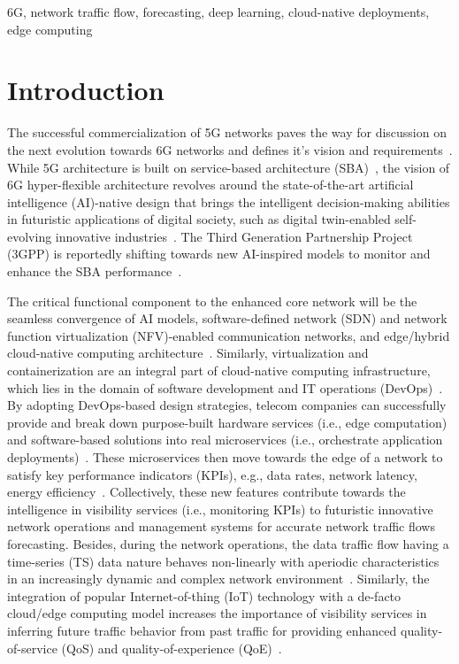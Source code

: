 \documentclass[10pt, conference]{IEEEtran}
\begin{document}
\begin{IEEEkeywords}
6G, network traffic flow, forecasting, deep learning, cloud-native deployments, edge computing
\end{IEEEkeywords}
\IEEEpeerreviewmaketitle

\section{Introduction}
The successful commercialization of 5G networks paves the way for discussion on the next evolution towards 6G networks and defines it's vision and requirements~\cite{saad2019vision}.
While 5G architecture is built on service-based architecture (SBA)~\cite{Aamir_IIoT}, the vision of 6G hyper-flexible architecture revolves around the state-of-the-art artificial intelligence (AI)-native design that brings the intelligent decision-making abilities in futuristic applications of digital society, such as digital twin-enabled self-evolving innovative industries~\cite{Roadmap,zeb2021industrial}. 
The Third Generation Partnership Project (3GPP) is reportedly shifting towards new AI-inspired models to monitor and enhance the SBA performance~\cite{ref}.

The critical functional component to the enhanced core network will be the seamless convergence of AI models, software-defined network (SDN) and network function virtualization (NFV)-enabled communication networks, and edge/hybrid cloud-native computing architecture~\cite{xiao2020toward,zeb2020}. Similarly, virtualization and containerization are an integral part of cloud-native computing infrastructure, which lies in the domain of software development and IT operations (DevOps)~\cite{waseem2020systematic}. By adopting DevOps-based design strategies, telecom companies can successfully provide and break down purpose-built hardware services (i.e., edge computation) and software-based solutions into real microservices (i.e., orchestrate application deployments)~\cite{kube5g}. These microservices then move towards the edge of a network to satisfy key performance indicators (KPIs), e.g., data rates, network latency, energy efficiency~\cite{SDNandCloudflow}. Collectively, these new features contribute towards the intelligence in visibility services (i.e., monitoring KPIs) to futuristic innovative network operations and management systems for accurate network traffic flows forecasting. Besides, during the network operations, the data traffic flow having a time-series (TS) data nature behaves non-linearly with aperiodic characteristics in an increasingly dynamic and complex network environment~\cite{timeseries}. Similarly, the integration of popular Internet-of-thing (IoT) technology with a de-facto cloud/edge computing model increases the importance of visibility services in inferring future traffic behavior from past traffic for providing enhanced quality-of-service (QoS) and quality-of-experience (QoE)~\cite{IoTQos}.
\end{document}
